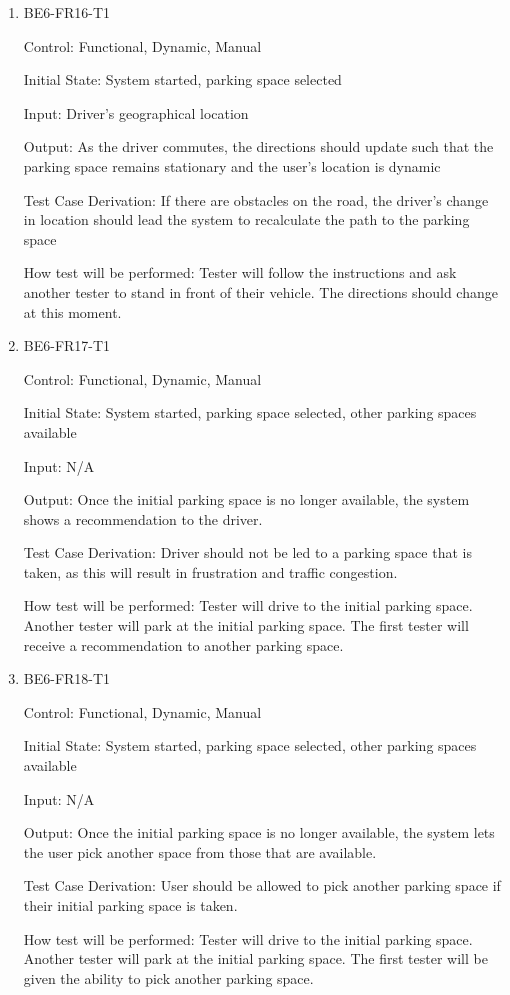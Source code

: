 \documentclass[12pt, titlepage]{article}
\begin{document}
\begin{enumerate}

\item{BE6-FR16-T1}

Control: Functional, Dynamic, Manual
					
Initial State: System started, parking space selected
					
Input: Driver's geographical location
					
Output: As the driver commutes, the directions should update such that the
parking space remains stationary and the user's location is dynamic

Test Case Derivation: If there are obstacles on the road, the driver's change in
location should lead the system to recalculate the path to the parking space
					
How test will be performed: Tester will follow the instructions and ask another
tester to stand in front of their vehicle. The directions should change at this
moment.

\item{BE6-FR17-T1}

Control: Functional, Dynamic, Manual
					
Initial State: System started, parking space selected, other parking spaces
available
					
Input: N/A
					
Output: Once the initial parking space is no longer available, the system shows
a recommendation to the driver.

Test Case Derivation: Driver should not be led to a parking space that is taken,
as this will result in frustration and traffic congestion.
					
How test will be performed: Tester will drive to the initial parking space.
Another tester will park at the initial parking space. The first tester will
receive a recommendation to another parking space.

\item{BE6-FR18-T1}

Control: Functional, Dynamic, Manual
					
Initial State: System started, parking space selected, other parking spaces
available
					
Input: N/A
					
Output: Once the initial parking space is no longer available, the system lets
the user pick another space from those that are available.

Test Case Derivation: User should be allowed to pick another parking space if
their initial parking space is taken.
					
How test will be performed: Tester will drive to the initial parking space.
Another tester will park at the initial parking space. The first tester will be
given the ability to pick another parking space.

\end{enumerate}
\end{document}
